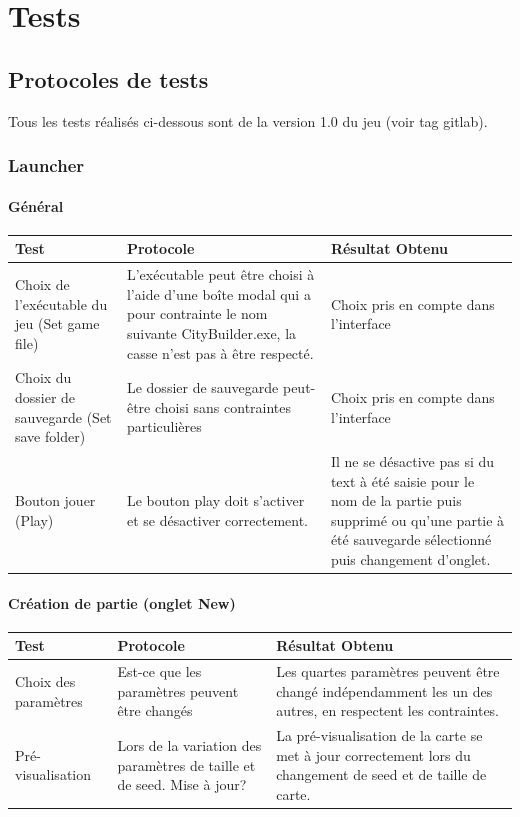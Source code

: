 \documentclass[a4paper,10pt,openany,oneside]{report}
\begin{document}
\section{Tests}
\thispagestyle{headings}
\subsection{Protocoles de tests}Tous les tests réalisés ci-dessous sont de la version 1.0 du jeu (voir tag gitlab).
\subsubsection{Launcher}

\paragraph{Général}
\begin{center}
	\begin{tabular}{| p{3cm} | p{6cm} | p{6cm} |}
	\hline
		 \textbf{Test} & \textbf{Protocole} & \textbf{Résultat Obtenu}
		 \\ \hline
		Choix de l'exécutable du jeu (Set game file)&
		L'exécutable peut être choisi à l'aide d'une boîte modal qui a pour contrainte le nom suivante CityBuilder.exe, la casse n'est pas à être respecté. &
		Choix pris en compte dans l'interface
		\\ \hline
		Choix du dossier de sauvegarde (Set save folder) &
		Le dossier de sauvegarde peut-être choisi sans contraintes particulières &
		Choix pris en compte dans l'interface
		\\ \hline
		Bouton jouer (Play) &
		Le bouton play doit s'activer et se désactiver correctement. &
		Il ne se désactive pas si du text à été saisie pour le nom de la partie puis supprimé ou qu'une partie à été sauvegarde sélectionné puis changement d'onglet.
		\\ \hline
	\hline
	\end{tabular}
\end{center}

\paragraph{Création de partie (onglet New)}
\begin{center}
	\begin{tabular}{| p{3cm} | p{6cm} | p{6cm} |}
	\hline
		 \textbf{Test} & \textbf{Protocole} & \textbf{Résultat Obtenu}
		 \\ \hline
		Choix des paramètres & Est-ce que les paramètres peuvent être changés & Les quartes paramètres peuvent être changé indépendamment les un des autres, en respectent les contraintes.
		\\ \hline
		Pré-visualisation & Lors de la variation des paramètres de taille et de seed. Mise à jour? & La pré-visualisation de la carte se met à jour correctement lors du changement de seed et de taille de carte.
		\\ \hline
	\hline
	\end{tabular}
\end{center}
\end{document}
